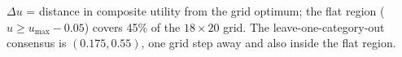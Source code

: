 \begin{table}[t]
\vspace{2pt}
\raggedright{\footnotesize $\Delta u$ = distance in composite utility from the
grid optimum; the flat region ($u \ge u_{\max} - 0.05$) covers 45\% of the
$18 \times 20$ grid. The leave-one-category-out consensus is $(0.175, 0.55)$,
one grid step away and also inside the flat region.}
\end{table}
